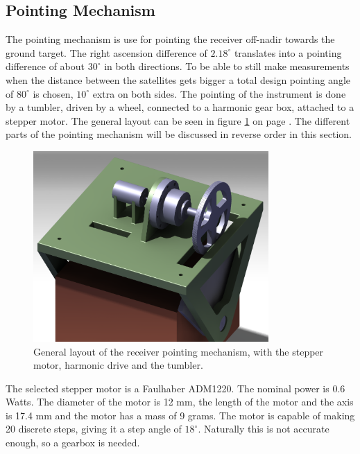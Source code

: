 \subsection{Pointing Mechanism}
\label{ss:recDDpoint}
The pointing mechanism is use for pointing the receiver off-nadir towards the ground target. The right ascension difference of $2.18^\circ$ translates into a pointing difference of about $30^\circ$ in both directions. To be able to still make measurements when the distance between the satellites gets bigger a total design pointing angle of $80^\circ$ is chosen, $10^\circ$ extra on both sides. The pointing of the instrument is done by a tumbler, driven by a wheel, connected to a harmonic gear box, attached to a stepper motor. The general layout can be seen in figure \ref{fig:point} on page \pageref{fig:point}. The different parts of the pointing mechanism will be discussed in reverse order in this section.

\begin{figure} [h]
\centering
\includegraphics[width=0.8\textwidth]{chapters/img/point_setup.png}
\caption[General layout of the receiver pointing mechanism]{General layout of the receiver pointing mechanism, with the stepper motor, harmonic drive and the tumbler.}
\label{fig:point}
\end{figure}

The selected stepper motor is a Faulhaber ADM1220. The nominal power is 0.6 Watts. The diameter of the motor is 12 mm, the length of the motor and the axis is 17.4 mm and the motor has a mass of 9 grams. The motor is capable of making 20 discrete steps, giving it a step angle of $18^\circ$. Naturally this is not accurate enough, so a gearbox is needed.

